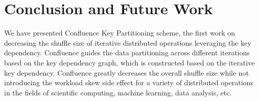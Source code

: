 \documentclass[10pt,journal,compsoc]{IEEEtran}
\begin{document}
\section{Conclusion and Future Work}\label{section:conclusion}
We have presented Confluence Key Partitioning scheme, the first work on decreasing the shuffle size of
iterative distributed operations leveraging the key dependency. 
Confluence guides the data partitioning across different iterations based on the key dependency graph, 
which is constructed based on the iterative key dependency.
Confluence greatly decreases the overall shuffle size while not introducing the workload skew side effect for a variety of distributed operations
in the fields of scientific computing, machine learning, data
analysis, etc.



%
%

\end{document}

